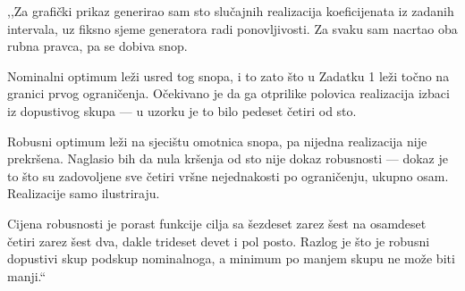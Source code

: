 \begin{izgovor}
,,Za grafički prikaz generirao sam sto slučajnih realizacija koeficijenata iz
zadanih intervala, uz fiksno sjeme generatora radi ponovljivosti. Za svaku sam
nacrtao oba rubna pravca, pa se dobiva snop.

Nominalni optimum leži usred tog snopa, i to zato što u Zadatku 1 leži točno na
granici prvog ograničenja. Očekivano je da ga otprilike polovica realizacija
izbaci iz dopustivog skupa --- u uzorku je to bilo pedeset četiri od sto.

Robusni optimum leži na sjecištu omotnica snopa, pa nijedna realizacija nije
prekršena. Naglasio bih da nula kršenja od sto nije dokaz robusnosti --- dokaz je
to što su zadovoljene sve četiri vršne nejednakosti po ograničenju, ukupno osam.
Realizacije samo ilustriraju.

Cijena robusnosti je porast funkcije cilja sa šezdeset zarez šest na osamdeset
četiri zarez šest dva, dakle trideset devet i pol posto. Razlog je što je
robusni dopustivi skup podskup nominalnoga, a minimum po manjem skupu ne može
biti manji.``
\end{izgovor}
